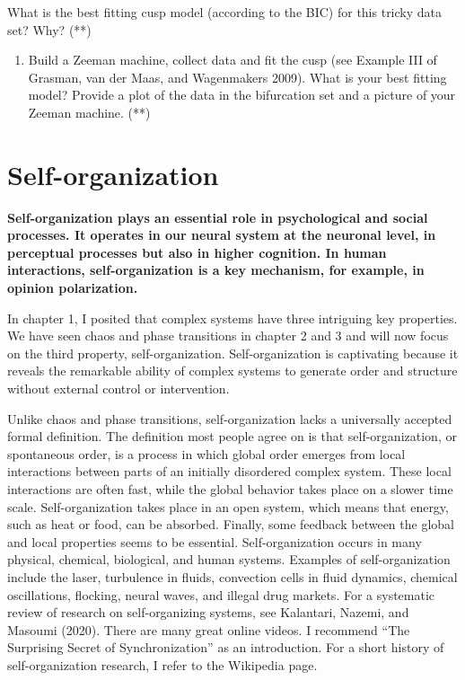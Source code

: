 \documentclass[
  letterpaper,
]{scrbook}
\providecommand{\tightlist}{%
  \setlength{\itemsep}{0pt}\setlength{\parskip}{0pt}}\usepackage{longtable,booktabs,array}
\begin{document}
What is the best fitting cusp model (according to the BIC) for this
tricky data set? Why? (**)

\begin{enumerate}
\def\labelenumi{\arabic{enumi})}
\setcounter{enumi}{7}
\tightlist
\item
  Build a Zeeman machine, collect data and fit the cusp (see Example III
  of Grasman, van der Maas, and Wagenmakers 2009). What is your best
  fitting model? Provide a plot of the data in the bifurcation set and a
  picture of your Zeeman machine. (**)
\end{enumerate}


\hypertarget{self-organization}{%
\chapter{Self-organization}\label{self-organization}}

\textbf{Self-organization plays an essential role in psychological and
social processes. It operates in our neural system at the neuronal
level, in perceptual processes but also in higher cognition. In human
interactions, self-organization is a key mechanism, for example, in
opinion polarization.}

In chapter 1, I posited that complex systems have three intriguing key
properties. We have seen chaos and phase transitions in chapter 2 and 3
and will now focus on the third property, self-organization.
Self-organization is captivating because it reveals the remarkable
ability of complex systems to generate order and structure without
external control or intervention.

Unlike chaos and phase transitions, self-organization lacks a
universally accepted formal definition. The definition most people agree
on is that self-organization, or spontaneous order, is a process in
which global order emerges from local interactions between parts of an
initially disordered complex system. These local interactions are often
fast, while the global behavior takes place on a slower time scale.
Self-organization takes place in an open system, which means that
energy, such as heat or food, can be absorbed. Finally, some feedback
between the global and local properties seems to be essential.
Self-organization occurs in many physical, chemical, biological, and
human systems. Examples of self-organization include the laser,
turbulence in fluids, convection cells in fluid dynamics, chemical
oscillations, flocking, neural waves, and illegal drug markets. For a
systematic review of research on self-organizing systems, see Kalantari,
Nazemi, and Masoumi (2020). There are many great online videos. I
recommend ``The Surprising Secret of Synchronization'' as an
introduction. For a short history of self-organization research, I refer
to the Wikipedia page.
\end{document}
